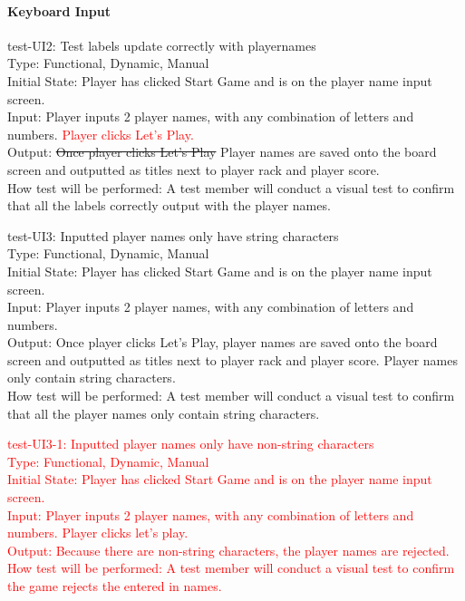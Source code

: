 \documentclass[12pt, titlepage]{article}
\begin{document}
\paragraph{Keyboard Input}
\begin{enumerate}
    \item{test-UI2: Test labels update correctly with playernames\\} %
    Type: Functional, Dynamic, Manual\\
    Initial State: Player has clicked Start Game and is on the player name input screen.\\
    Input: Player inputs 2 player names, with any combination of letters and numbers. \textcolor{red}{Player clicks Let's Play.}\\
    Output: \sout{Once player clicks Let's Play} Player names are saved onto the board screen and outputted as titles next to player rack and player score.\\
    How test will be performed: A test member will conduct a visual test to confirm that all the labels correctly output with the player names.\\
    
    \item{test-UI3: Inputted player names only have string characters\\} %
    Type: Functional, Dynamic, Manual\\
    Initial State: Player has clicked Start Game and is on the player name input screen.\\
    Input: Player inputs 2 player names, with any combination of letters and numbers.\\
    Output: Once player clicks Let's Play, player names are saved onto the board screen and outputted as titles next to player rack and player score. Player names only contain string characters.\\
    How test will be performed: A test member will conduct a visual test to confirm that all the player names only contain string characters.\\
    
    \textcolor{red}{\item{test-UI3-1: Inputted player names only have non-string characters\\} %
    Type: Functional, Dynamic, Manual\\
    Initial State: Player has clicked Start Game and is on the player name input screen.\\
    Input: Player inputs 2 player names, with any combination of letters and numbers. Player clicks let's play.\\
    Output: Because there are non-string characters, the player names are rejected.\\
    How test will be performed: A test member will conduct a visual test to confirm the game rejects the entered in names.\\}
    

\end{enumerate}
\end{document}
